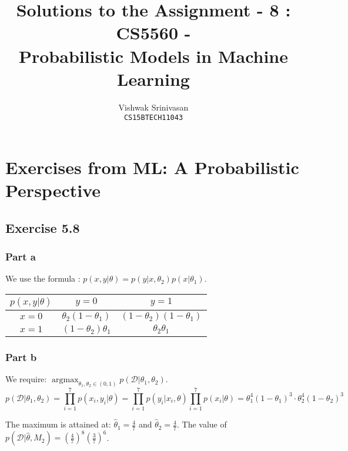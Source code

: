 \documentclass{article}
\title{Solutions to the Assignment - 8 : CS5560 - \\
Probabilistic Models in Machine Learning}
\author{Vishwak Srinivasan\\
\texttt{CS15BTECH11043}}
\date{}
\newcommand{\argmax}{\mathop{\mathrm{argmax}}}
\begin{document}
\maketitle

\section*{Exercises from ML: A Probabilistic Perspective}
\subsection*{Exercise 5.8}
\subsubsection*{Part a}
We use the formula : \(p(x, y | \theta) = p(y | x, \theta_{2}) p(x | \theta_{1})\).

\begin{center}
\begin{tabular}{c|cc}
\(p(x, y | \theta)\) & \(y = 0\) & \(y = 1\) \\
\hline
\(x = 0\) & \(\theta_{2}(1 - \theta_{1})\) & \((1 - \theta_{2})(1 - \theta_{1})\) \\
\(x = 1\) & \((1 - \theta_{2})\theta_{1}\) & \(\theta_{2}\theta_{1}\)
\end{tabular}
\end{center}

\subsubsection*{Part b}
\begin{flushleft}
We require: \(\displaystyle \argmax_{\theta_{1}, \theta_{2} \in (0, 1)} p(\mathcal{D} | \theta_{1}, \theta_{2})\).
\begin{equation}
p(\mathcal{D} | \theta_{1}, \theta_{2}) = \prod_{i=1}^{7} p(x_{i}, y_{i} | \theta) = \prod_{i=1}^{7} p(y_{i} | x_{i}, \theta) \prod_{i=1}^{7} p(x_{i} | \theta) = \theta_{1}^{4}(1 - \theta_{1})^{3} \cdot \theta_{2}^{4}(1 - \theta_{2})^{3}
\end{equation}

The maximum is attained at: \(\hat{\theta}_{1} = \frac{4}{7}\) and \(\hat{\theta}_{2} = \frac{4}{7}\). The value of \(p(\mathcal{D} | \hat{\theta}, M_{2}) = \left(\frac{4}{7}\right)^{8} \left(\frac{3}{7}\right)^{6}\).
\end{flushleft}
\end{document}
